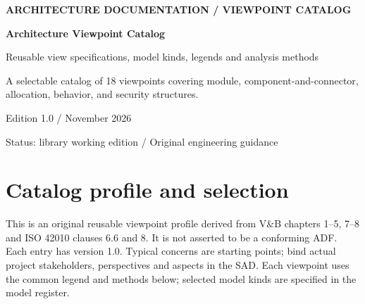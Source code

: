 \documentclass[11pt,letterpaper]{article}
\newcommand{\docsection}[1]{\Needspace{5\baselineskip}\section{#1}}
\begin{document}
\begin{titlepage}\thispagestyle{empty}\raggedright
\vspace*{0.65in}
{\sffamily\bfseries\color{teal} ARCHITECTURE DOCUMENTATION / VIEWPOINT CATALOG\par}
\vspace{0.35in}
{\sffamily\bfseries\color{navy}\Huge Architecture Viewpoint Catalog\par}
\vspace{0.2in}
{\sffamily\Large\color{muted} Reusable view specifications, model kinds, legends and analysis methods\par}
\vspace{0.35in}\noindent{\color{teal}\rule{\linewidth}{1.5pt}}\par
\vspace{0.3in}
A selectable catalog of 18 viewpoints covering module, component-and-connector, allocation, behavior, and security structures.

\vfill
{\sffamily\small Edition 1.0 \quad /  November 2026\par
Status: library working edition \quad / \quad Original engineering guidance\par}
\end{titlepage}
\tableofcontents\clearpage
\docsection{Catalog profile and selection}
This is an original reusable viewpoint profile derived from V\&B chapters 1--5, 7--8 and ISO 42010 clauses 6.6 and 8. It is not asserted to be a conforming ADF. Each entry has version 1.0. Typical concerns are starting points; bind actual project stakeholders, perspectives and aspects in the SAD. Each viewpoint uses the common legend and methods below; selected model kinds are specified in the model register.
\end{document}
